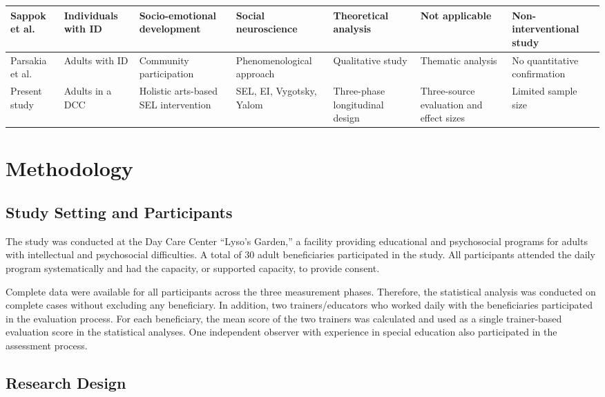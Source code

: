 \documentclass[journal]{IEEEtran}
\begin{document}
{\begin{landscape}
\begin{table}[H]
\begin{tabular}{p{2.8cm} p{3.2cm} p{3.6cm} p{3.2cm} p{3.0cm} p{3.2cm} p{3.8cm}}
\hline
Sappok et al. \cite{sappok2022} & Individuals with ID & Socio-emotional development & Social neuroscience & Theoretical analysis & Not applicable & Non-interventional study \\
\hline
Parsakia et al. \cite{parsakia2024} & Adults with ID & Community participation & Phenomenological approach & Qualitative study & Thematic analysis & No quantitative confirmation \\
\hline
Present study & Adults in a DCC & Holistic arts-based SEL intervention & SEL, EI, Vygotsky, Yalom & Three-phase longitudinal design & Three-source evaluation and effect sizes & Limited sample size \\
\hline
\end{tabular}
\end{table}
\vspace*{\fill}
\end{landscape}
\clearpage
}

\FloatBarrier
\section{Methodology}

\subsection{Study Setting and Participants}

The study was conducted at the Day Care Center ``Lyso's Garden,'' a facility providing educational and psychosocial programs for adults with intellectual and psychosocial difficulties. A total of 30 adult beneficiaries participated in the study. All participants attended the daily program systematically and had the capacity, or supported capacity, to provide consent.

Complete data were available for all participants across the three measurement phases. Therefore, the statistical analysis was conducted on complete cases without excluding any beneficiary. In addition, two trainers/educators who worked daily with the beneficiaries participated in the evaluation process. For each beneficiary, the mean score of the two trainers was calculated and used as a single trainer-based evaluation score in the statistical analyses. One independent observer with experience in special education also participated in the assessment process.

\subsection{Research Design}
\end{document}
